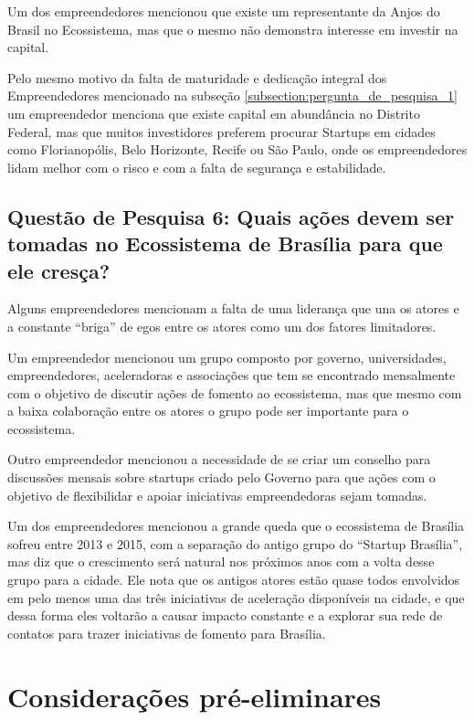 Um dos empreendedores mencionou que existe um representante da Anjos do Brasil no Ecossistema, mas que o mesmo não demonstra interesse em investir na capital.

Pelo mesmo motivo da falta de maturidade e dedicação integral dos Empreendedores mencionado na subseção \ref{subsection:pergunta_de_pesquisa_1} um empreendedor menciona que existe capital em abundância no Distrito Federal, mas que muitos investidores preferem procurar Startups em cidades como Florianopólis, Belo Horizonte, Recife ou São Paulo, onde os empreendedores lidam melhor com o risco e com a falta de segurança e estabilidade.

\subsection{Questão de Pesquisa 6: Quais ações devem ser tomadas no Ecossistema de Brasília para que ele cresça?}
\label{subsection:pergunta_de_pesquisa_6}

Alguns empreendedores mencionam a falta de uma liderança que una os atores e a constante ``briga'' de egos entre os atores como um dos fatores limitadores.

Um empreendedor mencionou um grupo composto por governo, universidades, empreendedores, aceleradoras e associações que tem se encontrado mensalmente com o objetivo de discutir ações de fomento ao ecossistema, mas que mesmo com a baixa colaboração entre os atores o grupo pode ser importante para o ecossistema. 

Outro empreendedor mencionou a necessidade de se criar um conselho para discussões mensais sobre startups criado pelo Governo para que ações com o objetivo de flexibilidar e apoiar iniciativas empreendedoras sejam tomadas.

Um dos empreendedores mencionou a grande queda que o ecossistema de Brasília sofreu entre 2013 e 2015, com a separação do antigo grupo do ``Startup Brasília'', mas diz que o crescimento será natural nos próximos anos com a volta desse grupo para a cidade. Ele nota que os antigos atores estão quase todos envolvidos em pelo menos uma das três iniciativas de aceleração disponíveis na cidade, e que dessa forma eles voltarão a causar impacto constante e a explorar sua rede de contatos para trazer iniciativas de fomento para Brasília.

\section{Considerações pré-eliminares}
\label{consideracoes_pre_eliminares}

